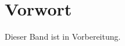 \documentclass[
  11pt,
  twoside,
  parskip=half, headings=normal,
  bibliography=totoc, listof=totoc
]{scrbook}
\begin{document}
\frontmatter


\chapter*{Vorwort}
Dieser Band ist in Vorbereitung.


\tableofcontents

\mainmatter


\backmatter
\end{document}
